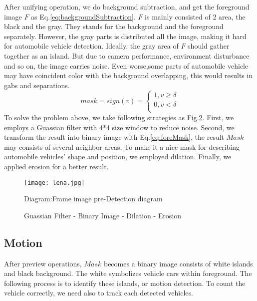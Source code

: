 \documentclass[conference]{IEEEtran}
\begin{document}
	After unifying operation, we do background subtraction, and get the foreground image $F$ as Eq.\ref{eq:backgroundSubtraction}. $F$ is mainly consisted of 2 area, the black and the gray. They stands for the background and the foreground separately. However, the gray parts is distributed all the image, making it hard for automobile vehicle detection. Ideally, the gray area of $F$ should gather together as an island. But due to camera performance, environment disturbance and so on, the image carries noise. Even worse,some parts of automobile vehicle may have coincident color with the background overlapping, this would results in gabs and separations.
	\begin{equation}
	  mask=sign(v)=\left\{
	   \begin{aligned}
	   	1, v \geq \delta \\
	   	0, v < \delta \\
	   \end{aligned}
	   \right.
	   \label{eq:foreMask}
	\end{equation}		
	To solve the problem above, we take following strategies as Fig.\ref{fig:preDetection}. First, we employs a Guassian filter with 4*4 size window to reduce noise. Second, we transform the result into binary image with Eq.\ref{eq:foreMask}, the result $Mask$ may consists of several neighbor areas. To make it a nice mask for describing automobile vehicles' shape and position, we employed dilation. Finally, we applied erosion for a better result. 
	\begin{figure}[!h]
	\centering
	\texttt{[image: lena.jpg]} 
	\caption{Diagram:Frame image pre-Detection diagram}
	\label{fig:preDetection}
	\end{figure}
	
	\begin{figure}[!h]
	\centering
	\caption{Guassian Filter - Binary Image - Dilation - Erosion}
	\label{fig:preDetection}
	\end{figure}
			
	
	\subsection{Motion}
	After preview operations, $Mask$ becomes a binary image consists of white islands and black background. The white symbolizes vehicle cars within foreground. The following process is to identify these islands, or motion detection. To count the vehicle correctly, we need also to track each detected vehicles.
	
\end{document}
